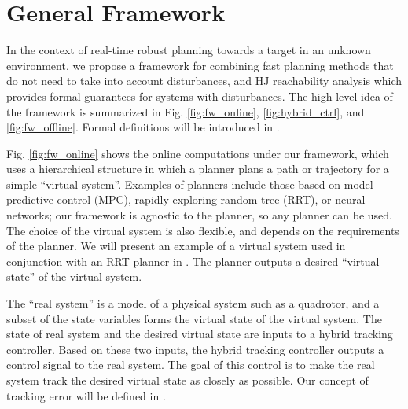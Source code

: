 \section{General Framework \label{sec:framework}}
In the context of real-time robust planning towards a target in an unknown environment, we propose a framework for combining fast planning methods that do not need to take into account disturbances, and HJ reachability analysis which provides formal guarantees for systems with disturbances. The high level idea of the framework is summarized in Fig. \ref{fig:fw_online}, \ref{fig:hybrid_ctrl}, and \ref{fig:fw_offline}. Formal definitions will be introduced in .

Fig. \ref{fig:fw_online} shows the online computations under our framework, which uses a hierarchical structure in which a planner plans a path or trajectory for a simple ``virtual system''. Examples of planners include those based on model-predictive control (MPC), rapidly-exploring random tree (RRT), or neural networks; our framework is agnostic to the planner, so any planner can be used. The choice of the virtual system is also flexible, and depends on the requirements of the planner. We will present an example of a virtual system used in conjunction with an RRT planner in . The planner outputs a desired ``virtual state'' of the virtual system.

The ``real system'' is a model of a physical system such as a quadrotor, and a subset of the state variables forms the virtual state of the virtual system. The state of real system and the desired virtual state are inputs to a hybrid tracking controller. Based on these two inputs, the hybrid tracking controller outputs a control signal to the real system. The goal of this control is to make the real system track the desired virtual state as closely as possible. Our concept of tracking error will be defined in .

